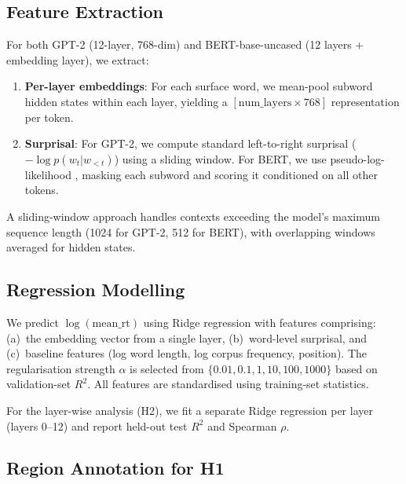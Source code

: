 \documentclass[11pt]{article}
\begin{document}
\subsection{Feature Extraction}

For both GPT-2 (12-layer, 768-dim) and BERT-base-uncased (12 layers + embedding layer), we extract:
\begin{enumerate}
    \item \textbf{Per-layer embeddings}: For each surface word, we mean-pool subword hidden states within each layer, yielding a $[\text{num\_layers} \times 768]$ representation per token.
    \item \textbf{Surprisal}: For GPT-2, we compute standard left-to-right surprisal ($-\log p(w_t | w_{<t})$) using a sliding window. For BERT, we use pseudo-log-likelihood \citep{salazar2020}, masking each subword and scoring it conditioned on all other tokens.
\end{enumerate}

A sliding-window approach handles contexts exceeding the model's maximum sequence length (1024 for GPT-2, 512 for BERT), with overlapping windows averaged for hidden states.

\subsection{Regression Modelling}

We predict $\log(\text{mean\_rt})$ using Ridge regression with features comprising: (a)~the embedding vector from a single layer, (b)~word-level surprisal, and (c)~baseline features (log word length, log corpus frequency, position).
The regularisation strength $\alpha$ is selected from $\{0.01, 0.1, 1, 10, 100, 1000\}$ based on validation-set $R^2$.
All features are standardised using training-set statistics.

For the layer-wise analysis (H2), we fit a separate Ridge regression per layer (layers 0--12) and report held-out test $R^2$ and Spearman $\rho$.

\subsection{Region Annotation for H1}
\end{document}
